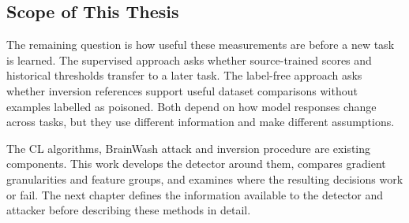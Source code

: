 \subsection{Scope of This Thesis}
\label{subsec:bg-scope}

The remaining question is how useful these measurements are before a new
task is learned. The supervised approach asks whether source-trained scores
and historical thresholds transfer to a later task. The label-free approach
asks whether inversion references support useful dataset comparisons without
examples labelled as poisoned. Both depend on how model responses change
across tasks, but they use different information and make different assumptions.

The CL algorithms, BrainWash attack and inversion procedure are existing
components. This work develops the detector around them, compares gradient
granularities and feature groups, and examines where the resulting decisions
work or fail. The next chapter defines the information available to the
detector and attacker before describing these methods in detail.

